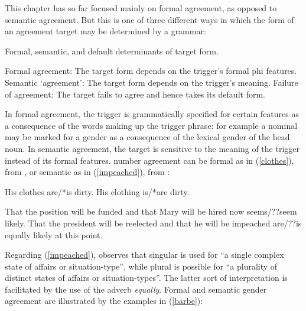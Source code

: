 \documentclass[output=paper,biblatex,babelshorthands,newtxmath,draftmode,colorlinks,citecolor=brown]{langscibook}
\begin{document}
\largerpage%
This chapter has so far focused mainly on formal agreement, as opposed to semantic agreement.   But
this is one of three different ways in which the form of an agreement target may be determined by a
grammar:

\begin{exe}
\ex   Formal, semantic, and default determinants of target form. 
\begin{xlist}
\ex	Formal agreement: The target form depends on the trigger's formal phi features.
\ex	Semantic `agreement’: The target form depends on the trigger's meaning.
\ex	Failure of agreement: The target fails to agree and hence takes its default form.
\end{xlist}
\end{exe}

\noindent
 In formal agreement, the trigger is grammatically specified for certain features as a consequence of the words making up the trigger phrase: for example a nominal may be marked for a gender as a consequence of the lexical gender of the head noun.  In semantic agreement, the target is sensitive to the meaning of the trigger instead of its formal features.   number agreement can be formal as in (\ref{clothes}), from \citet[92]{Wechsler:2013}, or semantic as in (\ref{impeached}), from \citet[92]{Mccloskey:1991}:

\begin{exe} 
\ex \label{clothes}
 \begin{xlist}
\ex   His clothes are/*is dirty.
\ex   His clothing is/*are dirty.
\end{xlist}
\end{exe}

\begin{exe} 
\ex \label{impeached}
 \begin{xlist}
\ex   That the position will be funded and that Mary will be hired now seems/??seem likely.
\ex  	That the president will be reelected and that he will be impeached are/??is equally likely at this point.
\end{xlist}
\end{exe}

\noindent
Regarding (\ref{impeached}), \citet[564--565]{Mccloskey:1991} observes that singular is used for ``a single complex state of affairs or situation-type'', while plural is possible for ``a plurality of distinct states of affairs or situation-types''.  The latter sort of interpretation is facilitated by the use of the adverb \textit{equally}.   Formal and semantic gender agreement are illustrated by the  examples in (\ref{barbe}):
\end{document}
